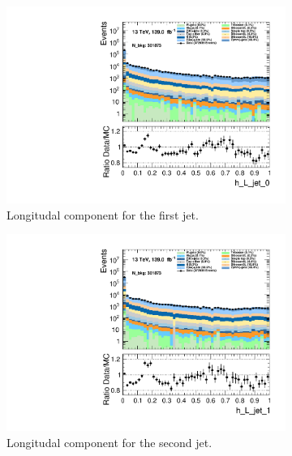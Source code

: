 \begin{figure}
    \centering
    \begin{subfigure}{.49\textwidth}
        \includegraphics[width=\textwidth]{Figures/MC_Data_comp/h_L_jet_0.pdf}
        \caption{Longitudal component for the first jet.}
        \label{fig:h_L_jet_0}
    \end{subfigure}
    \hfill
    \begin{subfigure}{.49\textwidth}
        \includegraphics[width=\textwidth]{Figures/MC_Data_comp/h_L_jet_1.pdf}
        \caption{Longitudal component for the second jet.}
        \label{fig:h_L_jet_1}
    \end{subfigure}
    \hfill 
    \begin{subfigure}{.49\textwidth}

\end{subfigure}
\end{figure}
